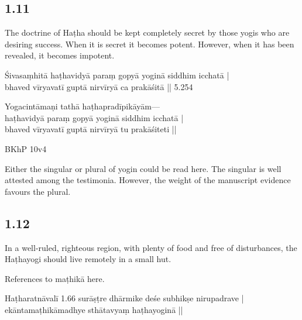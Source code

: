 \begin{ekdosis}
\subsection*{1.11}
\begin{translation}[hp01_011]
The doctrine of Haṭha should be kept completely secret by those yogis who are desiring success. When it is secret it becomes potent. However, when it has been revealed, it becomes impotent.
\end{translation}

\begin{sources}[hp01_011]
Śivasaṃhitā
\startverse
haṭhavidyā paraṃ gopyā yoginā siddhim icchatā |\\%
bhaved vīryavatī guptā nirvīryā ca prakāśitā || 5.254
\endverse
\end{sources}

\begin{testimonia}[hp01_011]
Yogacintāmaṇi
\startverse
tathā haṭhapradīpikāyām—\\
haṭhavidyā paraṃ gopyā yoginā siddhim icchatā |\\
bhaved vīryavatī guptā nirvīryā tu prakāśiteti ||
\endverse

BKhP 10v4
\end{testimonia}

\begin{philcomm}[hp01_011]        
Either the singular or plural of yogin could be read here. The singular is well attested among the testimonia. However, the weight of the manuscript evidence favours the plural.  
\end{philcomm}

\subsection*{1.12}
\begin{translation}[hp01_012]
In a well-ruled, righteous region, with plenty of food and free of disturbances, the Haṭhayogi should live remotely in a small hut.
\end{translation}

\begin{sources}[hp01_012]
References to maṭhikā here.
\end{sources}

\begin{testimonia}[hp01_012]
Haṭharatnāvalī 1.66
\startverse
surāṣṭre dhārmike deśe subhikṣe nirupadrave |\\
ekāntamaṭhikāmadhye sthātavyaṃ haṭhayoginā ||
\endverse


\end{testimonia}
\end{ekdosis}
